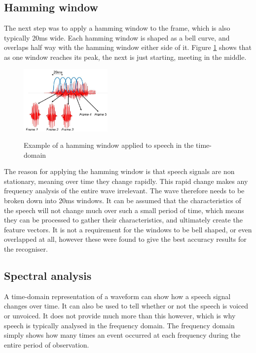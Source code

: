 \documentclass[journal]{IEEEtran}
\begin{document}
\subsection{Hamming window}
The next step was to apply a hamming window to the frame, which is also typically 20ms wide. Each hamming window is shaped as a bell curve, and overlaps half way with the hamming window either side of it. Figure \ref{fig:hamming} shows that as one window reaches its peak, the next is just starting, meeting in the middle.

\begin{figure}[!htb]
	\centering
	\captionsetup{justification=centering}
	\includegraphics[width=0.4\textwidth]{hamming.jpg}\\
	\caption{Example of a hamming window applied to speech in the time-domain}\label{fig:hamming}
\end{figure}

The reason for applying the hamming window is that speech signals are non stationary, meaning over time they change rapidly. This rapid change makes any frequency analysis of the entire wave irrelevant. The wave therefore needs to be broken down into 20ms windows. It can be assumed that the characteristics of the speech will not change much over such a small period of time, which means they can be processed to gather their characteristics, and ultimately create the feature vectors. It is not a requirement for the windows to be bell shaped, or even overlapped at all, however these were found to give the best accuracy results for the recogniser.

\subsection{Spectral analysis}
A time-domain representation of a waveform can show how a speech signal changes over time. It can also be used to tell whether or not the speech is voiced or unvoiced. It does not provide much more than this however, which is why speech is typically analysed in the frequency domain. The frequency domain simply shows how many times an event occurred at each frequency during the entire period of observation. 
\end{document}
